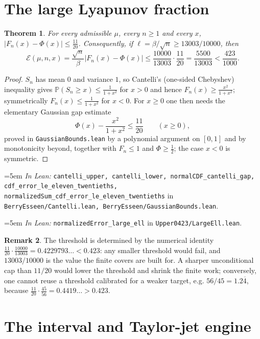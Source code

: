 \documentclass[11pt,a4paper]{article}
\newtheorem{theorem}{Theorem}[section]
\theoremstyle{definition}
\newtheorem{remark}[theorem]{Remark}
\newcommand{\PP}{\mathbb{P}}
\newcommand{\Lean}[1]{\texttt{#1}}
\newcommand{\file}[1]{\texttt{#1}}
\newcommand{\formal}[2]{%
  \par\smallskip
  \begingroup\small\raggedright\emergencystretch=5em
  \noindent\textit{In Lean:} \Lean{#1} in \file{#2}.\par
  \endgroup\smallskip}
\begin{document}
\section{The large Lyapunov fraction}
\label{sec:largeell}

\begin{theorem}
  \label{thm:cantelli}
  For every admissible $\mu$, every $n\ge1$ and every $x$,
  $\bigl|F_n(x)-\Phi(x)\bigr|\le\tfrac{11}{20}$. Consequently, if
  $\ell=\beta/\sqrt n\ge13003/10000$, then
  \[
    \mathcal E(\mu,n,x)=\frac{\sqrt n}{\beta}\bigl|F_n(x)-\Phi(x)\bigr|
    \le\frac{10000}{13003}\cdot\frac{11}{20}=\frac{5500}{13003}
    <\frac{423}{1000} .
  \]
\end{theorem}

\begin{proof}
  $S_n$ has mean $0$ and variance $1$, so Cantelli's (one-sided Chebyshev)
  inequality gives $\PP(S_n\ge x)\le\tfrac{1}{1+x^2}$ for $x>0$ and hence
  $F_n(x)\ge\tfrac{x^2}{1+x^2}$; symmetrically
  $F_n(x)\le\tfrac{1}{1+x^2}$ for $x<0$. For $x\ge0$ one then needs the
  elementary Gaussian gap estimate
  \[
    \Phi(x)-\frac{x^2}{1+x^2}\le\frac{11}{20}\qquad(x\ge0),
  \]
  proved in \file{GaussianBounds.lean} by a polynomial argument on $[0,1]$ and by
  monotonicity beyond, together with $F_n\le1$ and $\Phi\ge\tfrac12$; the case
  $x<0$ is symmetric.
\end{proof}
\formal{cantelli\_upper, cantelli\_lower, normalCDF\_cantelli\_gap, cdf\_error\_le\_eleven\_twentieths, normalizedSum\_cdf\_error\_le\_eleven\_twentieths}{BerryEsseen/Cantelli.lean, BerryEsseen/GaussianBounds.lean}
\formal{normalizedError\_large\_ell}{Upper0423/LargeEll.lean}

\begin{remark}
  The threshold is determined by the numerical identity
  $\tfrac{11}{20}\cdot\tfrac{10000}{13003}=0.4229793\ldots<0.423$: any smaller
  threshold would fail, and $13003/10000$ is the value the finite covers are
  built for. A sharper unconditional cap than $11/20$ would lower the threshold
  and shrink the finite work; conversely, one cannot reuse a threshold calibrated
  for a weaker target, e.g. $56/45=1.2\overline{4}$, because
  $\tfrac{11}{20}\cdot\tfrac{45}{56}=0.4419\ldots>0.423$.
\end{remark}

\section{The interval and Taylor-jet engine}
\label{sec:engine}
\end{document}
